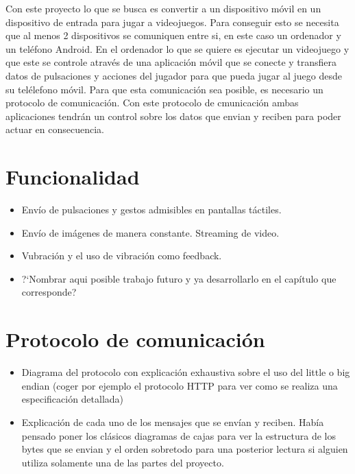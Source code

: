 Con este proyecto lo que se busca es convertir a un dispositivo m\'ovil en un dispositivo de entrada para jugar a videojuegos. Para conseguir esto se necesita que al menos 2 dispositivos se comuniquen entre si, en este caso un ordenador y un tel\'efono Android.
En el ordenador lo que se quiere es ejecutar un videojuego y que este se controle atrav\'es de una aplicaci\'on m\'ovil que se conecte y transfiera datos de pulsaciones y acciones del jugador para que pueda jugar al juego desde su tel\'elefono m\'ovil. Para que esta comunicaci\'on sea posible, es necesario un protocolo de comunicaci\'on. Con este protocolo de cmunicaci\'on ambas aplicaciones tendr\'an un control sobre los datos que envian y reciben para poder actuar en consecuencia.

\section{Funcionalidad}

\begin {itemize}
\item Env\'io de pulsaciones y gestos admisibles en pantallas t\'actiles.
\item Env\'io de im\'agenes de manera constante. Streaming de video.
\item Vubraci\'on y el uso de vibraci\'on como feedback.
\item ?`Nombrar aqui posible trabajo futuro y ya desarrollarlo en el cap\'itulo que corresponde?
\end {itemize}

\section{Protocolo de comunicaci\'on}
\begin {itemize}
\item Diagrama del protocolo con explicaci\'on exhaustiva sobre el uso del little o big endian (coger por ejemplo el protocolo HTTP para ver como se realiza una especificaci\'on detallada)
\item Explicaci\'on de cada uno de los mensajes que se env\'ian y reciben. Hab\'ia pensado poner los cl\'asicos diagramas de cajas para ver la estructura de los bytes que se envian y el orden sobretodo para una posterior lectura si alguien utiliza solamente una de las partes del proyecto.
\end {itemize}

